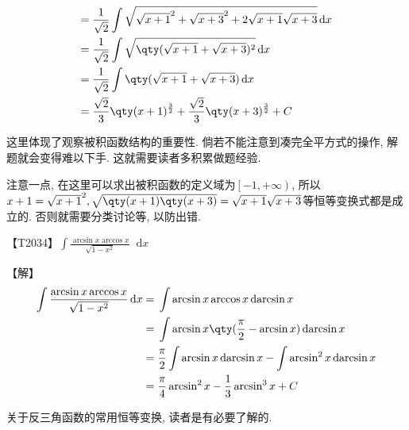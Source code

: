 \documentclass{ctexbook}
\newcommand*{\dif}{\mathop{}\!\mathrm{d}}
\begin{document}
{\begin{align*}
={}&\frac{1}{\sqrt{2}}\int\sqrt{\sqrt{x+1}^{2}+\sqrt{x+3}^{2}+2\sqrt{x+1}\sqrt{x+3}}\dif{x}\\
={}&\frac{1}{\sqrt{2}}\int\sqrt{\qty(\sqrt{x+1}+\sqrt{x+3})^{2}}\dif{x}\\
={}&\frac{1}{\sqrt{2}}\int\qty(\sqrt{x+1}+\sqrt{x+3})\dif{x}\\
={}&\frac{\sqrt{2}}{3}\qty(x+1)^{\frac{3}{2}}+\frac{\sqrt{2}}{3}\qty(x+3)^{\frac{3}{2}}+C
\end{align*}\par
{\kaishu 这里体现了观察被积函数结构的重要性. 倘若不能注意到凑完全平方式的操作, 解题就会变得难以下手. 这就需要读者多积累做题经验. \par
注意一点, 在这里可以求出被积函数的定义域为$\left[-1,+\infty\right)$, 所以$x+1=\sqrt{x+1}^{2},\\\sqrt{\qty(x+1)\qty(x+3)}=\sqrt{x+1}\sqrt{x+3}$等恒等变换式都是成立的. 否则就需要分类讨论等, 以防出错. \par}
【T2034】$\int\frac{\arcsin{x}\arccos{x}}{\sqrt{1-x^{2}}}\dif{x}$\par
【解】
\begin{align*}
\int\frac{\arcsin{x}\arccos{x}}{\sqrt{1-x^{2}}}\dif{x}={}&\int\arcsin{x}\arccos{x}\dif{\arcsin{x}}\\
={}&\int\arcsin{x}\qty(\frac{\pi}{2}-\arcsin{x})\dif{\arcsin{x}}\\
={}&\frac{\pi}{2}\int\arcsin{x}\dif{\arcsin{x}}-\int\arcsin^{2}{x}\dif{\arcsin{x}}\\
={}&\frac{\pi}{4}\arcsin^{2}{x}-\frac{1}{3}\arcsin^{3}{x}+C
\end{align*}\par
{\kaishu 关于反三角函数的常用恒等变换, 读者是有必要了解的. \par}
}
\end{document}
